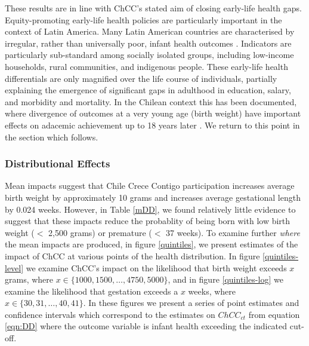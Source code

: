 \documentclass[12pt]{article}
\begin{document}
\begin{spacing}{1.4}
These results are in line with ChCC's stated aim of closing early-life
health gaps. Equity-promoting early-life health policies are
particularly important in the context of Latin America. Many Latin
American countries are characterised by irregular, rather than universally
poor, infant health outcomes \citep{Belizanetal2007}.  Indicators
are particularly sub-standard among socially isolated groups, including
low-income households, rural communities, and indigenous people.  These
early-life health differentials are only magnified over the life course of
individuals, partially explaining the emergence of significant gaps in
adulthood in education, salary, and morbidity and mortality. In the
Chilean context this has been documented, where divergence of outcomes at
a very young age (birth weight) have important effects on adacemic
achievement up to 18 years later \citep{Bharadwajetal2017}.  We return to
this point in the section which follows.

\subsubsection{Distributional Effects}
Mean impacts suggest that Chile Crece Contigo participation increases
average birth weight by approximately 10 grams and increases average
gestational length by 0.024 weeks.  However, in Table \ref{mDD}, we
found relatively little evidence to suggest that these impacts reduce the
probablity of being born with low birth weight ($<$ 2,500 grams) or
premature ($<$ 37 weeks).  To examine further \emph{where} the mean
impacts are produced, in figure \ref{quintiles}, we present estimates
of the impact of ChCC at various points of the health distribution.
In figure \ref{quintiles-level} we examine ChCC's impact on the
likelihood that birth weight exceeds $x$ grams, where
$x\in\{1000,1500,\ldots,4750,5000\}$, and in figure \ref{quintiles-log}
we examine the likelihood that gestation exceeds a $x$ weeks, where
$x\in\{30,31,\ldots,40,41\}$.  In these figures we present a series
of point estimates and confidence intervals which correspond to the
estimates on $ChCC_{ct}$ from equation \ref{eqn:DD} where the outcome
variable is infant health exceeding the indicated cut-off.



\end{spacing}
\end{document}

